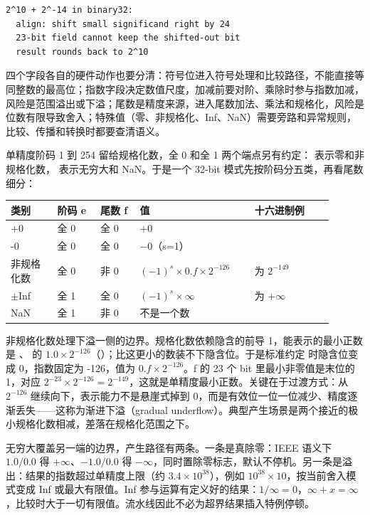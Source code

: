\begin{lstlisting}
2^10 + 2^-14 in binary32:
  align: shift small significand right by 24
  23-bit field cannot keep the shifted-out bit
  result rounds back to 2^10
\end{lstlisting}

四个字段各自的硬件动作也要分清：符号位进入符号处理和比较路径，不能直接等同整数的最高位；指数字段决定数值尺度，加减前要对阶、乘除时参与指数加减，风险是范围溢出或下溢；尾数是精度来源，进入尾数加法、乘法和规格化，风险是位数有限导致舍入；特殊值（零、非规格化、Inf、NaN）需要旁路和异常规则，比较、传播和转换时都要查清语义。

单精度阶码 1 到 254 留给规格化数，全 0 和全 1 两个端点另有约定： 表示零和非规格化数， 表示无穷大和 NaN。于是一个 32-bit 模式先按阶码分五类，再看尾数细分：

\begin{longtable}{L{0.13\linewidth}L{0.12\linewidth}L{0.11\linewidth}L{0.32\linewidth}L{0.22\linewidth}}
\toprule
类别 & 阶码 e & 尾数 f & 值 & 十六进制例 \\
\midrule
+0 & 全 0 & 全 0 & $+0$ &  \\
-0 & 全 0 & 全 0 & $-0$（s=1） &  \\
非规格化数 & 全 0 & 非 0 & $(-1)^{s} \times 0.f \times 2^{-126}$ &  为 $2^{-149}$ \\
$\pm$Inf & 全 1 & 全 0 & $(-1)^{s} \times \infty$ &  为 $+\infty$ \\
NaN & 全 1 & 非 0 & 不是一个数 &  \\
\bottomrule
\end{longtable}

非规格化数处理下溢一侧的边界。规格化数依赖隐含的前导 1，能表示的最小正数是 、 的 $1.0 \times 2^{-126}$（）；比这更小的数装不下隐含位。于是标准约定  时隐含位变成 0，指数固定为 -126，值为 $0.f \times 2^{-126}$。f 的 23 个 bit 里最小非零值是末位的 1，对应 $2^{-23} \times 2^{-126} = 2^{-149}$，这就是单精度最小正数。关键在于过渡方式：从 $2^{-126}$ 继续向下，表示能力不是悬崖式掉到 0，而是有效位一位一位减少、精度逐渐丢失——这称为渐进下溢（gradual underflow）。典型产生场景是两个接近的极小规格化数相减，差落在规格化范围之下。

无穷大覆盖另一端的边界，产生路径有两条。一条是真除零：IEEE 语义下 $1.0 / 0.0$ 得 $+\infty$、$-1.0 / 0.0$ 得 $-\infty$，同时置除零标志，默认不停机。另一条是溢出：结果的指数超过单精度上限（约 $3.4 \times 10^{38}$），例如 $10^{38} \times 10$，按当前舍入模式变成 Inf 或最大有限值。Inf 参与运算有定义好的结果：$1 / \infty = 0$，$\infty + x = \infty$，比较时大于一切有限值。流水线因此不必为超界结果插入特例停顿。

